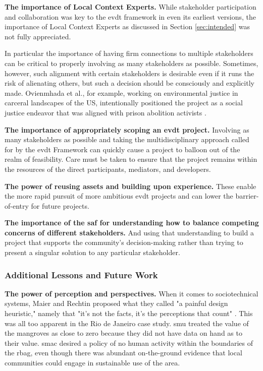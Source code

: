 \textbf{The importance of Local Context Experts.} While stakeholder participation and collaboration was key to the \ac{evdt} framework in even its earliest versions, the importance of Local Context Experts as discussed in Section \ref{sec:intended} was not fully appreciated. 

In particular the importance of having firm connections to multiple stakeholders can be critical to properly involving as many stakeholders as possible. Sometimes, however, such alignment with certain stakeholders is desirable even if it runs the risk of alienating others, but such a decision should be consciously and explicitly made. Ovienmhada et al., for example, working on environmental justice in carceral landscapes of the US, intentionally positioned the project as a social justice endeavor that was aligned with prison abolition activists \cite{ovienmhadaEnvironmentVulnerabilityDecisionTechnologyModelingFramework2021}. 

\textbf{The importance of appropriately scoping an \ac{evdt} project.} Involving as many stakeholders as possible and taking the multidisciplinary approach called for by the \ac{evdt} Framework can quickly cause a project to balloon out of the realm of feasibility. Care must be taken to ensure that the project remains within the resources of the direct participants, mediators, and developers.

\textbf{The power of reusing assets and building upon experience.} These enable the more rapid pursuit of more ambitious \ac{evdt} projects and can lower the barrier-of-entry for future projects.

\textbf{The importance of the \ac{saf} for understanding how to balance competing concerns of different stakeholders.} And using that understanding to build a project that supports the community's decision-making rather than trying to present a singular solution to any particular stakeholder.

\subsubsection{Additional Lessons and Future Work}

\textbf{The power of perception and perspectives.} When it comes to sociotechnical systems, Maier and Rechtin proposed what they called "a painful design heuristic," namely that "it's not the facts, it's the perceptions that count" \cite{maierArtSystemsArchitecting2009}. This was all too apparent in the Rio de Janeiro case study. \ac{smu} treated the value of the mangroves as close to zero because they did not have data on hand as to their value. \ac{smac} desired a policy of no human activity within the boundaries of the \ac{rbag}, even though there was abundant on-the-ground evidence that local communities could engage in sustainable use of the area. 

